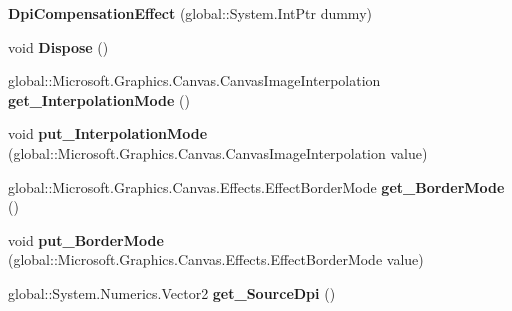 \begin{DoxyCompactItemize}
{\bfseries Dpi\+Compensation\+Effect} (global\+::\+System.\+Int\+Ptr dummy)
\item 
\mbox{\label{class_microsoft_1_1_graphics_1_1_canvas_1_1_effects_1_1_dpi_compensation_effect_af986b9bbf6e6ad3ab1adde3673a2c57c}} 
void {\bfseries Dispose} ()
\item 
\mbox{\label{class_microsoft_1_1_graphics_1_1_canvas_1_1_effects_1_1_dpi_compensation_effect_ab1505e3760906582e945043639fcfb16}} 
global\+::\+Microsoft.\+Graphics.\+Canvas.\+Canvas\+Image\+Interpolation {\bfseries get\+\_\+\+Interpolation\+Mode} ()
\item 
\mbox{\label{class_microsoft_1_1_graphics_1_1_canvas_1_1_effects_1_1_dpi_compensation_effect_ab95d5e8e9e140918df664c046fe70e53}} 
void {\bfseries put\+\_\+\+Interpolation\+Mode} (global\+::\+Microsoft.\+Graphics.\+Canvas.\+Canvas\+Image\+Interpolation value)
\item 
\mbox{\label{class_microsoft_1_1_graphics_1_1_canvas_1_1_effects_1_1_dpi_compensation_effect_a5640110355a62fb5ce7b280be6b2ead4}} 
global\+::\+Microsoft.\+Graphics.\+Canvas.\+Effects.\+Effect\+Border\+Mode {\bfseries get\+\_\+\+Border\+Mode} ()
\item 
\mbox{\label{class_microsoft_1_1_graphics_1_1_canvas_1_1_effects_1_1_dpi_compensation_effect_a2dbdf38c149aa690fe383653db643db6}} 
void {\bfseries put\+\_\+\+Border\+Mode} (global\+::\+Microsoft.\+Graphics.\+Canvas.\+Effects.\+Effect\+Border\+Mode value)
\item 
\mbox{\label{class_microsoft_1_1_graphics_1_1_canvas_1_1_effects_1_1_dpi_compensation_effect_aba9725fe6d69bf324f59bb8c77745665}} 
global\+::\+System.\+Numerics.\+Vector2 {\bfseries get\+\_\+\+Source\+Dpi} ()
\item 
\mbox{\label{class_microsoft_1_1_graphics_1_1_canvas_1_1_effects_1_1_dpi_compensation_effect_ae562d1d30976c9ba693a67de919e272a}} 

\end{DoxyCompactItemize}
